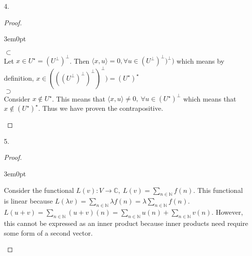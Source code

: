 \documentclass[11pt]{article}
\newcommand{\N}{\mathbb{N}}
\newcommand{\C}{\mathbb{C}}
\newcommand{\inn}[2]{\langle#1,#2\rangle}
\newenvironment{myproof}
{\begin{proof} \begin{adjustwidth}{3em}{0pt}$ $\par\nobreak\ignorespaces}
{\end{adjustwidth} \end{proof}}
\begin{document}
\begin{flushleft}
\newpage

4.

\begin{myproof}
$\subset$ \\
\bigskip
Let $x \in U^\star = (U^\perp)^\perp$. Then $\inn{x}{u} = 0, \forall u \in (U^\perp)^\perp)^\perp)$ which means by definition, $x \in (((U^\perp)^\perp)^\perp)^\perp) = (U^\star)^\star$
\\
\bigskip
$\supset$ \\
\bigskip
Consider $x \notin U^\star$. This means that $\inn{x}{u} \neq 0, \ \forall u \in (U^\star)^\perp$ which means that $x \notin (U^\star)^\star$. Thus we have proven the contrapositive.
\end{myproof}

\newpage

5.

\begin{myproof}
Consider the functional $L(v):V \to \C , \ L(v) = \sum_{n \in \N} f(n)$. This functional is linear because $L(\lambda v) = \sum_{n \in \N}  \lambda f(n) = \lambda \sum_{n \in \N} f(n)$. $L(u + v) = \sum_{n \in \N} (u+v)(n) = \sum_{n \in \N} u(n) + \sum_{n \in \N} v(n)$. However, this cannot be expressed as an inner product because inner products need require some form of a second vector.
\end{myproof}

\end{flushleft}
\end{document}

